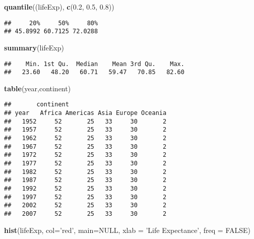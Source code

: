 \documentclass[]{article}
\newenvironment{Shaded}{\begin{snugshade}}{\end{snugshade}}
\newcommand{\DataTypeTok}[1]{\textcolor[rgb]{0.13,0.29,0.53}{#1}}
\newcommand{\FloatTok}[1]{\textcolor[rgb]{0.00,0.00,0.81}{#1}}
\newcommand{\KeywordTok}[1]{\textcolor[rgb]{0.13,0.29,0.53}{\textbf{#1}}}
\newcommand{\NormalTok}[1]{#1}
\newcommand{\OtherTok}[1]{\textcolor[rgb]{0.56,0.35,0.01}{#1}}
\newcommand{\StringTok}[1]{\textcolor[rgb]{0.31,0.60,0.02}{#1}}
\begin{document}
\begin{Shaded}
\begin{Highlighting}[]
\KeywordTok{quantile}\NormalTok{((lifeExp), }\KeywordTok{c}\NormalTok{(}\FloatTok{0.2}\NormalTok{, }\FloatTok{0.5}\NormalTok{, }\FloatTok{0.8}\NormalTok{))}
\end{Highlighting}
\end{Shaded}

\begin{verbatim}
##     20%     50%     80% 
## 45.8992 60.7125 72.0288
\end{verbatim}

\begin{Shaded}
\begin{Highlighting}[]
\KeywordTok{summary}\NormalTok{(lifeExp)}
\end{Highlighting}
\end{Shaded}

\begin{verbatim}
##    Min. 1st Qu.  Median    Mean 3rd Qu.    Max. 
##   23.60   48.20   60.71   59.47   70.85   82.60
\end{verbatim}

\begin{Shaded}
\begin{Highlighting}[]
\KeywordTok{table}\NormalTok{(year,continent)}
\end{Highlighting}
\end{Shaded}

\begin{verbatim}
##       continent
## year   Africa Americas Asia Europe Oceania
##   1952     52       25   33     30       2
##   1957     52       25   33     30       2
##   1962     52       25   33     30       2
##   1967     52       25   33     30       2
##   1972     52       25   33     30       2
##   1977     52       25   33     30       2
##   1982     52       25   33     30       2
##   1987     52       25   33     30       2
##   1992     52       25   33     30       2
##   1997     52       25   33     30       2
##   2002     52       25   33     30       2
##   2007     52       25   33     30       2
\end{verbatim}

\begin{Shaded}
\begin{Highlighting}[]
\KeywordTok{hist}\NormalTok{(lifeExp, }\DataTypeTok{col=}\StringTok{'red'}\NormalTok{, }\DataTypeTok{main=}\OtherTok{NULL}\NormalTok{, }\DataTypeTok{xlab =} \StringTok{'Life Expectance'}\NormalTok{,}
\DataTypeTok{freq =} \OtherTok{FALSE}\NormalTok{)}
\end{Highlighting}
\end{Shaded}
\end{document}
